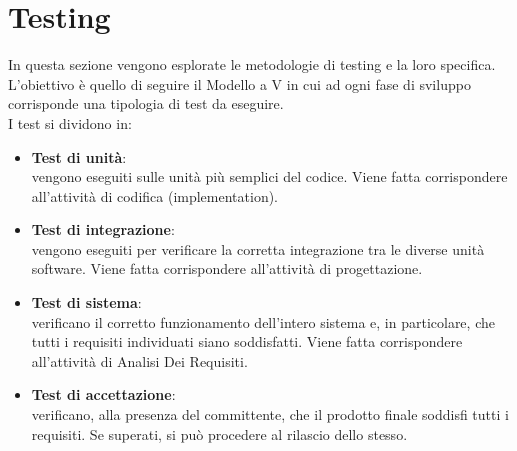 

\section{Testing}
In questa sezione vengono esplorate le metodologie di testing e la loro specifica. L'obiettivo è quello di seguire il Modello a V in cui ad ogni fase di sviluppo corrisponde una tipologia di test da eseguire.\\
I test si dividono in:
\begin{itemize}
    \item \textbf{Test di unità}:\\
    vengono eseguiti sulle unità più semplici del codice. Viene fatta corrispondere all'attività di codifica (implementation).
    \item \textbf{Test di integrazione}:\\
    vengono eseguiti per verificare la corretta integrazione tra le diverse unità software. Viene fatta corrispondere all'attività di progettazione.
    \item \textbf{Test di sistema}:\\
    verificano il corretto funzionamento dell'intero sistema e, in particolare, che tutti i requisiti individuati siano soddisfatti. Viene fatta corrispondere all'attività di Analisi Dei Requisiti. 
    \item \textbf{Test di accettazione}:\\
    verificano, alla presenza del committente, che il prodotto finale soddisfi tutti i requisiti. Se superati, si può procedere al rilascio dello stesso.
\end{itemize}
